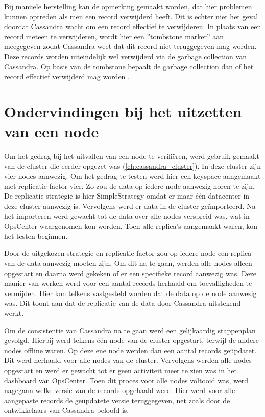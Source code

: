 Bij manuele herstelling kan de opmerking gemaakt worden, dat hier problemen kunnen optreden als men een record verwijderd heeft.
Dit is echter niet het geval doordat Cassandra wacht om een record effectief te verwijderen.
In plaats van een record meteen te verwijderen, wordt hier een ''tombstone marker'' aan meegegeven zodat Cassandra weet dat dit record niet teruggegeven mag worden.
Deze records worden uiteindelijk wel verwijderd via de garbage collection van Cassandra.
Op basis van de tombstone bepaalt de garbage collection dan of het record effectief verwijderd mag worden \citep{strickland2014availability}.

\section{Ondervindingen bij het uitzetten van een node}
Om het gedrag bij het uitvallen van een node te verifiëren, werd gebruik gemaakt van de cluster die eerder opgezet was (\ref{ch:cassandra_cluster}).
In deze cluster zijn vier nodes aanwezig.
Om het gedrag te testen werd hier een keyspace aangemaakt met replicatie factor vier.
Zo zou de data op iedere node aanwezig horen te zijn.
De replicatie strategie is hier SimpleStrategy omdat er maar één datacenter in deze cluster aanwezig is. Vervolgens werd er data in de cluster geïmporteerd.
Na het importeren werd gewacht tot de data over alle nodes verspreid was, wat in OpsCenter waargenomen kon worden.
Toen alle replica's aangemaakt waren, kon het testen beginnen.

Door de uitgekozen strategie en replicatie factor zou op iedere node een replica van de data aanwezig moeten zijn.
Om dit na te gaan, werden alle nodes alleen opgestart en daarna werd gekeken of er een specifieke record aanwezig was.
Deze manier van werken werd voor een aantal records herhaald om toevalligheden te vermijden.
Hier kon telkens vastgesteld worden dat de data op de node aanwezig was.
Dit toont aan dat de replicatie van de data door Cassandra uitstekend werkt.

Om de consistentie van Cassandra na te gaan werd een gelijkaardig stappenplan gevolgd.
Hierbij werd telkens één node van de cluster opgestart, terwijl de andere nodes offline waren.
Op deze ene node werden dan een aantal records geüpdatet.
Dit werd herhaald voor alle nodes van de cluster.
Vervolgens werden alle nodes opgestart en werd er gewacht tot er geen activiteit meer te zien was in het dashboard van OpsCenter.
Toen dit proces voor alle nodes voltooid was, werd nagegaan welke versie van de records opgehaald werd.
Hier werd voor alle aangepaste records de geüpdatete versie teruggegeven, net zoals door de ontwikkelaars van Cassandra beloofd is.